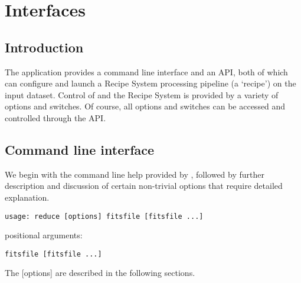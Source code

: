 \documentclass[letterpaper,10pt,english]{sphinxmanual}
\begin{document}
\chapter{Interfaces}
\label{interfaces:interfaces}\label{interfaces::doc}

\section{Introduction}
\label{interfaces:introduction}
The  application provides a command line interface and an API, both
of which can configure and launch a Recipe System processing pipeline (a `recipe')
on the input dataset. Control of  and the Recipe System is provided
by a variety of options and switches. Of course, all options and switches
can be accessed and controlled through the API.


\section{Command line interface}
\label{interfaces:command-line-interface}
We begin with the command line help provided by , followed by
further description and discussion of certain non-trivial options that require
detailed explanation.

\begin{Verbatim}[commandchars=\\\{\}]
usage: reduce [options] fitsfile [fitsfile ...]
\end{Verbatim}

positional arguments:

\begin{Verbatim}[commandchars=\\\{\}]
fitsfile [fitsfile ...]
\end{Verbatim}

The {[}options{]} are described in the following sections.
\end{document}
